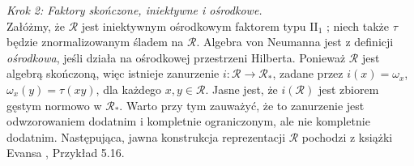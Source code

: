{\it Krok 2: Faktory skończone, iniektywne i ośrodkowe.}\\
Załóżmy, że $\mathcal{R}$ jest iniektywnym ośrodkowym faktorem typu
II$\phantom{}_{1}$ \cite{Takesaki3};
niech także $\tau$ będzie znormalizowanym śladem na $\mathcal{R}$.
Algebra von Neumanna jest z definicji \emph{ośrodkowa},
jeśli działa na ośrodkowej przestrzeni Hilberta.
Ponieważ $\mathcal{R}$ jest algebrą skończoną, więc istnieje zanurzenie 
$i: \mathcal{R} \rightarrow
\mathcal{R}_{*}$, zadane przez $i(x) = \omega_{x}$, $\omega_{x}(y) = \tau(xy)$,
dla każdego $x,y \in \mathcal{R}$.
Jasne jest, że $i(\mathcal{R})$
jest zbiorem gęstym normowo w $\mathcal{R}_{*}$.
Warto przy tym zauważyć, że to zanurzenie jest odwzorowaniem dodatnim i kompletnie
ograniczonym, ale nie kompletnie dodatnim.
Następująca, jawna konstrukcja reprezentacji $\mathcal{R}$
pochodzi z książki Evansa \cite{Evans1998}, Przykład 5.16.

